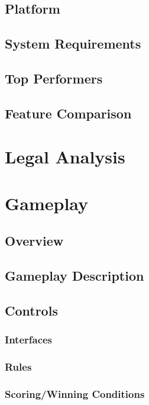 \documentclass[12pt]{article}
\begin{document}
\subsection{Platform}

\subsection{System Requirements}

\subsection{Top Performers}

\subsection{Feature Comparison}

\newpage

\section{Legal Analysis}

\newpage

\section{Gameplay}

\subsection{Overview}

\subsection{Gameplay Description}

\subsection{Controls}

\subsubsection{Interfaces}

\subsubsection{Rules}

\subsubsection{Scoring/Winning Conditions}
\end{document}
